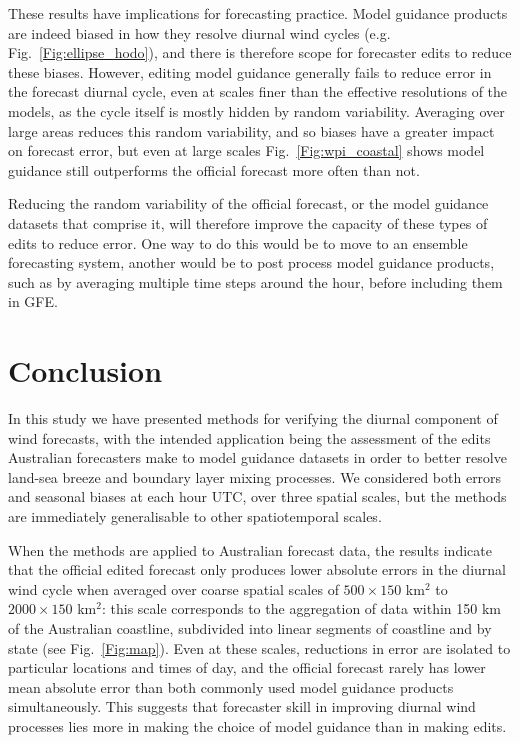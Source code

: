 \documentclass{ametsoc}
\begin{document}
These results have implications for forecasting practice. Model guidance products are indeed biased in how they resolve diurnal wind cycles (e.g. Fig.~\ref{Fig:ellipse_hodo}), and there is therefore scope for forecaster edits to reduce these biases. However, editing model guidance generally fails to reduce error in the forecast diurnal cycle, even at scales finer than the effective resolutions of the models, as the cycle itself is mostly hidden by random variability. Averaging over large areas reduces this random variability, and so biases have a greater impact on forecast error, but even at large scales Fig.~\ref{Fig:wpi_coastal} shows model guidance still outperforms the official forecast more often than not. 

Reducing the random variability of the official forecast, or the model guidance datasets that comprise it, will therefore improve the capacity of these types of edits to reduce error. One way to do this would be to move to an ensemble forecasting system, another would be to post process model guidance products, such as by averaging multiple time steps around the hour, before including them in GFE. 

\section{Conclusion}
\label{Sec:Conclusion}
In this study we have presented methods for verifying the diurnal component of wind forecasts, with the intended application being the assessment of the edits Australian forecasters make to model guidance datasets in order to better resolve land-sea breeze and boundary layer mixing processes. We considered both errors and seasonal biases at each hour UTC, over three spatial scales, but the methods are immediately generalisable to other spatiotemporal scales. 

When the methods are applied to Australian forecast data, the results indicate that the official edited forecast only produces lower absolute errors in the diurnal wind cycle when averaged over coarse spatial scales of $500\times 150$ km$^{2}$ to $2000 \times 150$ km$^{2}$: this scale corresponds to the aggregation of data within 150 km of the Australian coastline, subdivided into linear segments of coastline and by state (see Fig.~\ref{Fig:map}). Even at these scales, reductions in error are isolated to particular locations and times of day, and the official forecast rarely has lower mean absolute error than both commonly used model guidance products simultaneously. This suggests that forecaster skill in improving diurnal wind processes lies more in making the choice of model guidance than in making edits.
\end{document}
